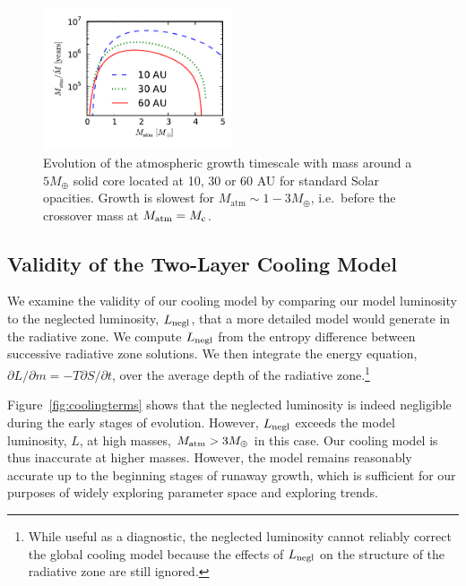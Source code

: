 \documentclass[apj, numberedappendix]{emulateapj}
\newcommand{\p}{\partial}
\newcommand{\Fig}[1]{Figure~\ref{#1}}
\newcommand{\Figs}[2]{Figs.~\ref{#1} and \ref{#2}}
\newcommand{\co}{_{\rm c}}
\begin{document}

\begin{figure}[tb]
\centering
\includegraphics[width=0.5\textwidth]{../../figs/ModelAtmospheres/RadSelfGravPoly/PaperFigs/Mt_profile_temp.pdf}
\caption{Evolution of the atmospheric growth timescale with mass around a $5 M_{\oplus}$ solid core  located at 10, 30 or 60 AU for standard Solar opacities.  Growth is slowest for $M_{\mathrm{atm}} \sim 1 - 3 M_{\oplus}$, i.e.\ before the crossover mass at $M_{\rm atm} = M\co$.}
\label{fig:growthtime}
\end{figure}

\subsection{Validity of the Two-Layer Cooling Model}
\label{sec:endoftime}

We examine the  validity of our cooling model by comparing our model luminosity to the neglected luminosity, $L_{\rm negl}$,  that a more detailed model would generate in the radiative zone.  We compute $L_{\rm negl}$ from the entropy difference between successive radiative zone solutions.  We then integrate the energy equation, $\p L / \p m = - T \p S/ \p t$, over the average depth of the radiative zone.\footnote{While useful as a diagnostic, the neglected luminosity cannot reliably correct the global cooling model because the effects of $L_{\rm negl}$ on the structure of the radiative zone are still ignored.}

 \Fig{fig:coolingterms} shows that the neglected luminosity is indeed negligible during the early stages of evolution.  However, $L_{\rm negl}$ exceeds the model luminosity, $L$, at high masses, $M_{\rm atm} > 3 M_\oplus$ in this case.  Our cooling model is thus inaccurate at higher masses.  However, the model remains reasonably accurate up to the beginning stages of runaway growth, which is sufficient for our purposes of widely exploring parameter space and exploring trends.
 
\end{document}
